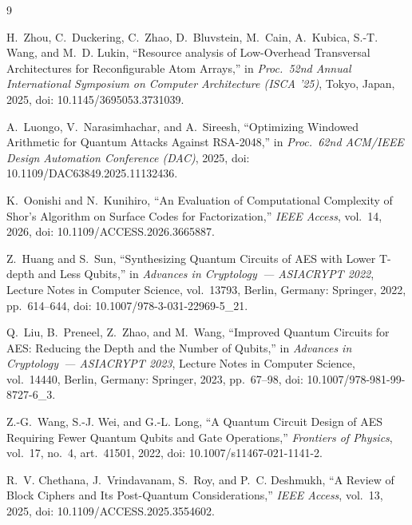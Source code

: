 \documentclass[11pt,a4paper]{article}
\begin{document}
\newpage
{}
{}
\begin{thebibliography}{9}

H.~Zhou, C.~Duckering, C.~Zhao, D.~Bluvstein, M.~Cain, A.~Kubica, S.-T. Wang, and M.~D. Lukin, ``Resource analysis of Low-Overhead Transversal Architectures for Reconfigurable Atom Arrays,'' in \emph{Proc.\ 52nd Annual International Symposium on Computer Architecture (ISCA '25)}, Tokyo, Japan, 2025, doi: 10.1145/3695053.3731039.

A.~Luongo, V.~Narasimhachar, and A.~Sireesh, ``Optimizing Windowed Arithmetic for Quantum Attacks Against RSA-2048,'' in \emph{Proc.\ 62nd ACM/IEEE Design Automation Conference (DAC)}, 2025, doi: 10.1109/DAC63849.2025.11132436.

K.~Oonishi and N.~Kunihiro, ``An Evaluation of Computational Complexity of Shor's Algorithm on Surface Codes for Factorization,'' \emph{IEEE Access}, vol.~14, 2026, doi: 10.1109/ACCESS.2026.3665887.

Z.~Huang and S.~Sun, ``Synthesizing Quantum Circuits of AES with Lower T-depth and Less Qubits,'' in \emph{Advances in Cryptology~--- ASIACRYPT 2022}, Lecture Notes in Computer Science, vol.~13793, Berlin, Germany: Springer, 2022, pp.~614--644, doi: 10.1007/978-3-031-22969-5\_21.

Q.~Liu, B.~Preneel, Z.~Zhao, and M.~Wang, ``Improved Quantum Circuits for AES: Reducing the Depth and the Number of Qubits,'' in \emph{Advances in Cryptology~--- ASIACRYPT 2023}, Lecture Notes in Computer Science, vol.~14440, Berlin, Germany: Springer, 2023, pp.~67--98, doi: 10.1007/978-981-99-8727-6\_3.

Z.-G.~Wang, S.-J. Wei, and G.-L. Long, ``A Quantum Circuit Design of AES Requiring Fewer Quantum Qubits and Gate Operations,'' \emph{Frontiers of Physics}, vol.~17, no.~4, art.~41501, 2022, doi: 10.1007/s11467-021-1141-2.

R.~V. Chethana, J.~Vrindavanam, S.~Roy, and P.~C. Deshmukh, ``A Review of Block Ciphers and Its Post-Quantum Considerations,'' \emph{IEEE Access}, vol.~13, 2025, doi: 10.1109/ACCESS.2025.3554602.

\end{thebibliography}
\end{document}
